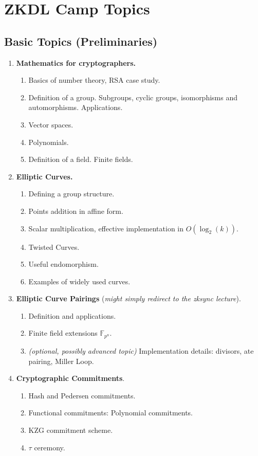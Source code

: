 \documentclass{zkdl-template}
\begin{document}
\section*{ZKDL Camp Topics}

\subsection*{Basic Topics (Preliminaries)}

\begin{enumerate}
    \item \textbf{Mathematics for cryptographers.}
    \begin{enumerate}
        \item Basics of number theory, RSA case study.
        \item Definition of a group. Subgroups, cyclic groups, isomorphisms and automorphisms. Applications.
        \item Vector spaces.
        \item Polynomials.
        \item Definition of a field. Finite fields.
    \end{enumerate}
    \item \textbf{Elliptic Curves.}
    \begin{enumerate}
        \item Defining a group structure.
        \item Points addition in affine form.
        \item Scalar multiplication, effective implementation in $O(\log_2(k))$.
        \item Twisted Curves.
        \item Useful endomorphism.
        \item Examples of widely used curves.
    \end{enumerate}
    \item \textbf{Elliptic Curve Pairings} (\textit{might simply redirect to the zksync lecture}).
    \begin{enumerate}
        \item Definition and applications.
        \item Finite field extensions $\mathbb{F}_{p^n}$.
        \item \textit{(optional, possibly advanced topic)} Implementation details: divisors, ate pairing, Miller Loop.
    \end{enumerate}
    \item \textbf{Cryptographic Commitments}.
    \begin{enumerate}
        \item Hash and Pedersen commitments.
        \item Functional commitments: Polynomial commitments.
        \item KZG commitment scheme.
        \item $\tau$ ceremony.
    \end{enumerate}
\end{enumerate}
\end{document}
